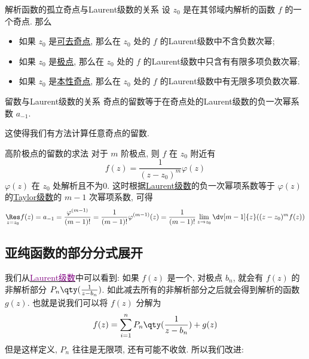 \documentclass[UTF8]{ctexart}
\newcommand{\hyperrefc}[2]{\hyperref[#1]{\textcolor{purple}{#2}}}
\begin{document}
        \begin{thm}
            {解析函数的孤立奇点与Laurent级数的关系}
            设 \(z_0\) 是在其邻域内解析的函数 \(f\) 的一个奇点. 那么
            \begin{itemize}
                \item 如果 \(z_0\) 是\hyperref[dfn:RemovableSingularity]{可去奇点}, 那么在 \(z_0\) 处的 \(f\) 的Laurent级数中不含负数次幂; 
                \item 如果 \(z_0\) 是\hyperref[dfn:PolarSingularity]{极点}, 那么在 \(z_0\) 处的 \(f\) 的Laurent级数中只含有有限多项负数次幂; 
                \item 如果 \(z_0\) 是\hyperref[dfn:EssentialSingularity]{本性奇点}, 那么在 \(z_0\) 处的 \(f\) 的Laurent级数中有无限多项负数次幂. 
            \end{itemize}
        \end{thm}

        \begin{crl}
            {留数与Laurent级数的关系}
            奇点的留数等于在奇点处的Laurent级数的负一次幂系数 \(a_{-1}\).
        \end{crl}

        这使得我们有方法计算任意奇点的留数. 

        \begin{crl}
            {高阶极点的留数的求法}
            对于 \(m\) 阶极点, 则 \(f\) 在 \(z_0\) 附近有
            \[f(z)=\frac{1}{(z-z_0)^m}\varphi(z)\]
            \(\varphi(z)\) 在 \(z_0\) 处解析且不为0. 这时根据\hyperref[thm:Laurent]{Laurent级数}的负一次幂项系数等于 \(\varphi(z)\) 的\hyperref[thm:TaylorSeries]{Taylor级数}的 \(m-1\) 次幂项系数, 可得
            \[\underset{z=z_0}{\Res}f(z)=a_{-1}=\frac{\varphi^{(m-1)}}{(m-1)!}=\frac{1}{(m-1)!}\varphi^{(m-1)}(z)=\frac{1}{(m-1)!}\lim_{z\to z_0}\dv[m-1]{z}((z-z_0)^mf(z))\]
        \end{crl}
    
    \subsection{亚纯函数的部分分式展开}

        我们从\hyperrefc{thm:Laurent}{Laurent级数}中可以看到: 如果 \(f(z)\) 是一个\MeromorphicFunction, 对极点 \(b_n\), 就会有 \(f(z)\) 的非解析部分 \(P_n\qty(\frac{1}{z-b_n})\). 如此减去所有的非解析部分之后就会得到解析的函数 \(g(z)\). 也就是说我们可以将 \(f(z)\) 分解为
        \[f(z)=\sum_{i=1}^{n}P_n\qty(\frac{1}{z-b_n})+g(z)\]
        但是这样定义,  \(P_n\) 往往是无限项, 还有可能不收敛. 所以我们改进: 
\end{document}
